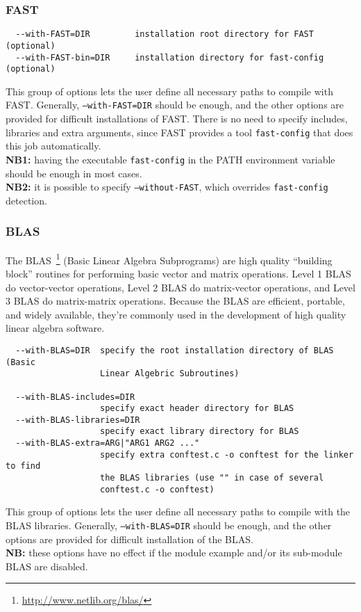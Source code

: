 \subsubsection{FAST}\label{fast_compil}
{\footnotesize
\begin{verbatim}
  --with-FAST=DIR         installation root directory for FAST (optional)
  --with-FAST-bin=DIR     installation directory for fast-config (optional)
\end{verbatim}
}
\noindent This group of options lets the user define all necessary
paths to compile with FAST. Generally, \texttt{--with-FAST=DIR} should
be enough, and the other options are provided for difficult
installations of FAST. There is no need to specify includes, libraries
and extra arguments, since FAST provides a tool \texttt{fast-config}
that does this job automatically.\\ \textbf{NB1:} having the
executable \texttt{fast-config} in the PATH environment variable
should be enough in most cases.\\ \textbf{NB2:} it is possible to
specify \texttt{--without-FAST}, which overrides \texttt{fast-config}
detection.

\subsubsection{BLAS}
The BLAS~\footnote{\url{http://www.netlib.org/blas/}} (Basic Linear
Algebra Subprograms) are high quality ``building block'' routines for
performing basic vector and matrix operations.  Level 1 BLAS do
vector-vector operations, Level 2 BLAS do matrix-vector operations,
and Level 3 BLAS do matrix-matrix operations. Because the BLAS are
efficient, portable, and widely available, they're commonly used in
the development of high quality linear algebra software.

{\footnotesize
\begin{verbatim}
  --with-BLAS=DIR  specify the root installation directory of BLAS (Basic
                   Linear Algebric Subroutines)

  --with-BLAS-includes=DIR
                   specify exact header directory for BLAS
  --with-BLAS-libraries=DIR
                   specify exact library directory for BLAS
  --with-BLAS-extra=ARG|"ARG1 ARG2 ..."
                   specify extra conftest.c -o conftest for the linker to find
                   the BLAS libraries (use "" in case of several 
                   conftest.c -o conftest)
\end{verbatim}
}
\noindent This group of options lets the user define all necessary
paths to compile with the BLAS libraries. Generally,
\texttt{--with-BLAS=DIR} should be enough, and the other options are
provided for difficult installation of the BLAS.\\ \textbf{NB:} these
options have no effect if the module example and/or its sub-module
BLAS are disabled.

